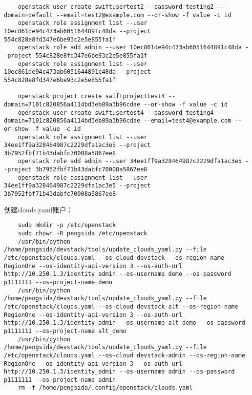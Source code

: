 \documentclass[a4paper,left=1.5cm,right=1.5cm,11pt]{article}
\begin{document}
\begin{lstlisting}
	openstack user create swiftusertest2 --password testing2 --domain=default --email=test2@example.com --or-show -f value -c id
	openstack role assignment list --user 10ec861de94c473ab6051644891c48da --project 554c828e8fd347e6be93c2e5e855fa1f
	openstack role add admin --user 10ec861de94c473ab6051644891c48da --project 554c828e8fd347e6be93c2e5e855fa1f
	openstack role assignment list --user 10ec861de94c473ab6051644891c48da --project 554c828e8fd347e6be93c2e5e855fa1f

	openstack project create swiftprojecttest4 --domain=7101c820856a4114bd3eb89a3b96cdae --or-show -f value -c id
	openstack user create swiftusertest4 --password testing4 --domain=7101c820856a4114bd3eb89a3b96cdae --email=test4@example.com --or-show -f value -c id
	openstack role assignment list --user 34ee1ff9a328464987c2229dfa1ac3e5 --project 3b7952fbf71b43dabfc70008a5867ee8
	openstack role add admin --user 34ee1ff9a328464987c2229dfa1ac3e5 --project 3b7952fbf71b43dabfc70008a5867ee8
	openstack role assignment list --user 34ee1ff9a328464987c2229dfa1ac3e5 --project 3b7952fbf71b43dabfc70008a5867ee8
	\end{lstlisting}

	创建clouds.yaml账户：
	\begin{lstlisting}
	sudo mkdir -p /etc/openstack
	sudo chown -R pengsida /etc/openstack
	/usr/bin/python /home/pengsida/devstack/tools/update_clouds_yaml.py --file /etc/openstack/clouds.yaml --os-cloud devstack --os-region-name RegionOne --os-identity-api-version 3 --os-auth-url http://10.250.1.3/identity_admin --os-username demo --os-password p1111111 --os-project-name demo
	/usr/bin/python /home/pengsida/devstack/tools/update_clouds_yaml.py --file /etc/openstack/clouds.yaml --os-cloud devstack-alt --os-region-name RegionOne --os-identity-api-version 3 --os-auth-url http://10.250.1.3/identity_admin --os-username alt_demo --os-password p1111111 --os-project-name alt_demo
	/usr/bin/python /home/pengsida/devstack/tools/update_clouds_yaml.py --file /etc/openstack/clouds.yaml --os-cloud devstack-admin --os-region-name RegionOne --os-identity-api-version 3 --os-auth-url http://10.250.1.3/identity_admin --os-username admin --os-password p1111111 --os-project-name admin
	rm -f /home/pengsida/.config/openstack/clouds.yaml
	\end{lstlisting}
\end{document}
